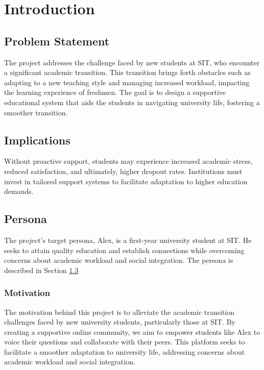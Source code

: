 \chapter{Introduction}\label{introduction}

\section{Problem Statement}\label{problem_statement}
The project addresses the challenge faced by new students at SIT, who encounter a significant academic transition. This transition brings forth obstacles such as adapting to a new teaching style and managing increased workload, impacting the learning experience of freshmen. The goal is to design a supportive educational system that aids the students in navigating university life, fostering a smoother transition.

\section{Implications}\label{implications}
Without proactive support, students may experience increased academic stress, reduced satisfaction, and ultimately, higher dropout rates. Institutions must invest in tailored support systems to facilitate adaptation to higher education demands.

\section{Persona}\label{persona}
The project's target persona, Alex, is a first-year university student at SIT. He seeks to attain quality education and establish connections while overcoming concerns about academic workload and social integration. The persona is described in Section \ref{persona}

\subsection{Motivation}
The motivation behind this project is to alleviate the academic transition challenges faced by new university students, particularly those at SIT. By creating a supportive online community, we aim to empower students like Alex to voice their questions and collaborate with their peers. This platform seeks to facilitate a smoother adaptation to university life, addressing concerns about academic workload and social integration.

